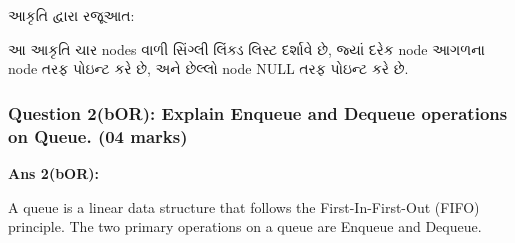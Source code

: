 આકૃતિ દ્વારા રજૂઆત:

\begin{Shaded}
\begin{Highlighting}[]
\end{Highlighting}
\end{Shaded}

આ આકૃતિ ચાર nodes વાળી સિંગ્લી લિંક્ડ લિસ્ટ દર્શાવે છે, જ્યાં દરેક node આગળના node
તરફ પોઇન્ટ કરે છે, અને છેલ્લો node NULL તરફ પોઇન્ટ કરે છે.

\hypertarget{question-2bor-explain-enqueue-and-dequeue-operations-on-queue.-04-marks}{%
\subsubsection{Question 2(bOR): Explain Enqueue and Dequeue operations
on Queue. (04
marks)}\label{question-2bor-explain-enqueue-and-dequeue-operations-on-queue.-04-marks}}

\textbf{Ans 2(bOR):}

A queue is a linear data structure that follows the First-In-First-Out
(FIFO) principle. The two primary operations on a queue are Enqueue and
Dequeue.


